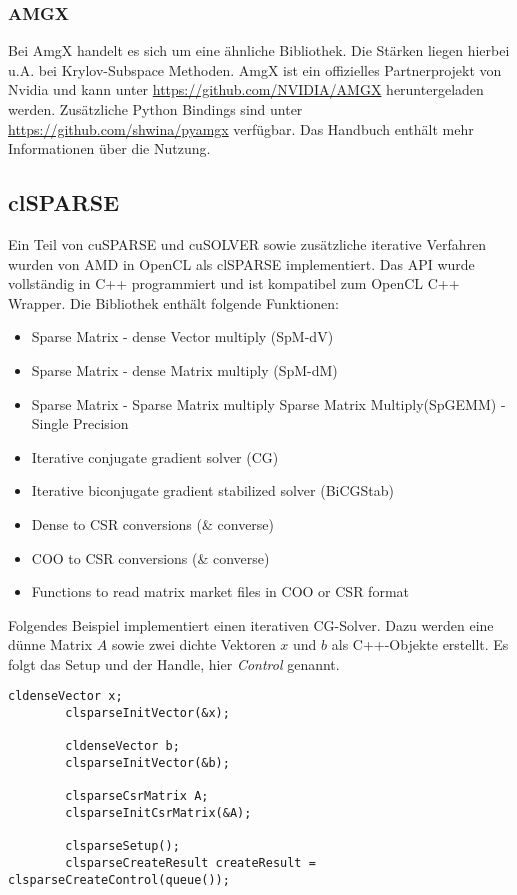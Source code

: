 			\subsubsection{AMGX}	
			Bei AmgX handelt es sich um eine ähnliche Bibliothek. Die Stärken liegen hierbei u.A. bei Krylov-Subspace Methoden. AmgX ist ein offizielles Partnerprojekt von Nvidia und kann unter \url{https://github.com/NVIDIA/AMGX} heruntergeladen werden. Zusätzliche Python Bindings sind unter \url{https://github.com/shwina/pyamgx} verfügbar. Das Handbuch enthält mehr Informationen über die Nutzung. \autocite{amgx}	
			
		\subsection{clSPARSE}
		Ein Teil von cuSPARSE und cuSOLVER sowie zusätzliche iterative Verfahren wurden von AMD in OpenCL als clSPARSE implementiert. Das \Gls{API} wurde vollständig in C++ programmiert und ist kompatibel zum OpenCL C++ Wrapper. Die Bibliothek enthält folgende Funktionen:
		
		\begin{itemize}				
			\item Sparse Matrix - dense Vector multiply (SpM-dV)
			\item Sparse Matrix - dense Matrix multiply (SpM-dM)
			\item Sparse Matrix - Sparse Matrix multiply Sparse Matrix Multiply(SpGEMM) - Single Precision
			\item Iterative conjugate gradient solver (CG)
			\item Iterative biconjugate gradient stabilized solver (BiCGStab)
			\item Dense to CSR conversions (\& converse)
			\item COO to CSR conversions (\& converse)
			\item Functions to read matrix market files in COO or CSR format
    	    \end{itemize}
    	
        	Folgendes Beispiel implementiert einen iterativen CG-Solver. Dazu werden eine dünne Matrix $A$ sowie zwei dichte Vektoren $x$ und $b$ als C++-Objekte erstellt. Es folgt das Setup und der \Gls{Handle}, hier \textit{Control} genannt. 
        	
        	\newpage
        	
        	\begin{lstlisting}[caption=clSPARSE: Initialisieren]
        cldenseVector x;
        clsparseInitVector(&x);
		
        cldenseVector b;
        clsparseInitVector(&b); 

        clsparseCsrMatrix A;
        clsparseInitCsrMatrix(&A); 
    	
        clsparseSetup();
        clsparseCreateResult createResult = clsparseCreateControl(queue());
        	\end{lstlisting}

